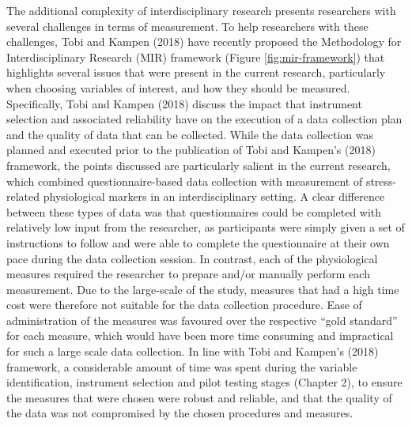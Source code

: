 \documentclass[man,floatsintext]{apa6}
\begin{document}
The additional complexity of interdisciplinary research presents researchers with several challenges in terms of measurement.
To help researchers with these challenges, Tobi and Kampen (2018) have recently proposed the Methodology for Interdisciplinary Research (MIR) framework (Figure \ref{fig:mir-framework}) that highlights several issues that were present in the current research, particularly when choosing variables of interest, and how they should be measured.
Specifically, Tobi and Kampen (2018) discuss the impact that instrument selection and associated reliability have on the execution of a data collection plan and the quality of data that can be collected.
While the data collection was planned and executed prior to the publication of Tobi and Kampen's (2018) framework, the points discussed are particularly salient in the current research, which combined questionnaire-based data collection with measurement of stress-related physiological markers in an interdisciplinary setting.
A clear difference between these types of data was that questionnaires could be completed with relatively low input from the researcher, as participants were simply given a set of instructions to follow and were able to complete the questionnaire at their own pace during the data collection session.
In contrast, each of the physiological measures required the researcher to prepare and/or manually perform each measurement. Due to the large-scale of the study, measures that had a high time cost were therefore not suitable for the data collection procedure.
Ease of administration of the measures was favoured over the respective \enquote{gold standard} for each measure, which would have been more time consuming and impractical for such a large scale data collection.
In line with Tobi and Kampen's (2018) framework, a considerable amount of time was spent during the variable identification, instrument selection and pilot testing stages (Chapter 2), to ensure the measures that were chosen were robust and reliable, and that the quality of the data was not compromised by the chosen procedures and measures.
\end{document}

